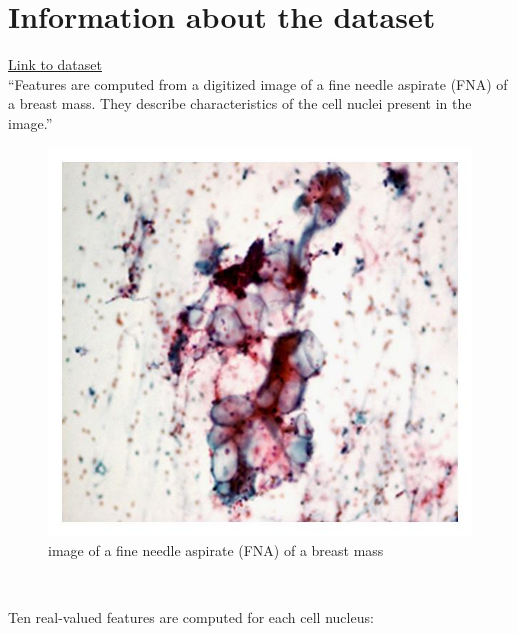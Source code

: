 \documentclass[
  11pt,
]{article}
\begin{document}
\hypertarget{information-about-the-dataset}{%
\section{Information about the
dataset}\label{information-about-the-dataset}}

\href{https://archive.ics.uci.edu/ml/datasets/Breast+Cancer+Wisconsin+\%28Diagnostic\%29}{Link
to dataset}\\

``Features are computed from a digitized image of a fine needle aspirate
(FNA) of a breast mass. They describe characteristics of the cell nuclei
present in the image.''\\

\begin{figure}
\centering
\includegraphics{fig1.jpg}
\caption{image of a fine needle aspirate (FNA) of a breast mass}
\end{figure}

\(~\) \(~\)

Ten real-valued features are computed for each cell nucleus:
\end{document}
